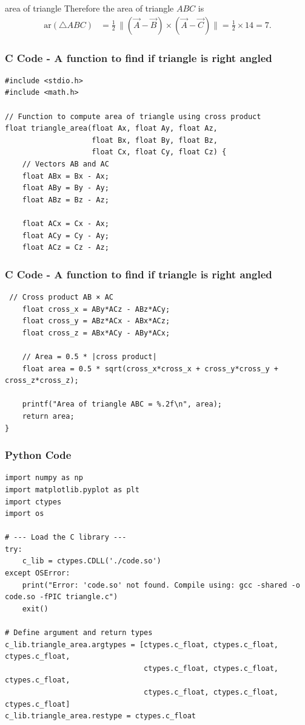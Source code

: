 \documentclass{beamer}
\begin{document}
\begin{frame}{area of triangle}
Therefore the area of triangle \(ABC\) is
\begin{align}
\text{ar}(\triangle ABC)
&= \tfrac{1}{2}\,\big\lVert (\vec{A}-\vec{B}) \times (\vec{A}-\vec{C}) \big\rVert
= \tfrac{1}{2}\times 14 = 7.
\label{eq:area}
\end{align}
\end{frame}

\begin{frame}[fragile]
    \frametitle{C Code - A function to find if triangle is right angled }

    \begin{lstlisting}
#include <stdio.h>
#include <math.h>

// Function to compute area of triangle using cross product
float triangle_area(float Ax, float Ay, float Az,
                    float Bx, float By, float Bz,
                    float Cx, float Cy, float Cz) {
    // Vectors AB and AC
    float ABx = Bx - Ax;
    float ABy = By - Ay;
    float ABz = Bz - Az;

    float ACx = Cx - Ax;
    float ACy = Cy - Ay;
    float ACz = Cz - Az;
     \end{lstlisting}
\end{frame}

\begin{frame}[fragile]
    \frametitle{C Code - A function to find if triangle is right angled }

    \begin{lstlisting}
 // Cross product AB × AC
    float cross_x = ABy*ACz - ABz*ACy;
    float cross_y = ABz*ACx - ABx*ACz;
    float cross_z = ABx*ACy - ABy*ACx;

    // Area = 0.5 * |cross product|
    float area = 0.5 * sqrt(cross_x*cross_x + cross_y*cross_y + cross_z*cross_z);

    printf("Area of triangle ABC = %.2f\n", area);
    return area;
}

     \end{lstlisting}
\end{frame}

\begin{frame}[fragile]
    \frametitle{Python Code}
    \begin{lstlisting}
import numpy as np
import matplotlib.pyplot as plt
import ctypes
import os

# --- Load the C library ---
try:
    c_lib = ctypes.CDLL('./code.so')
except OSError:
    print("Error: 'code.so' not found. Compile using: gcc -shared -o code.so -fPIC triangle.c")
    exit()

# Define argument and return types
c_lib.triangle_area.argtypes = [ctypes.c_float, ctypes.c_float, ctypes.c_float,
                                ctypes.c_float, ctypes.c_float, ctypes.c_float,
                                ctypes.c_float, ctypes.c_float, ctypes.c_float]
c_lib.triangle_area.restype = ctypes.c_float
    \end{lstlisting}
\end{frame}
\end{document}
